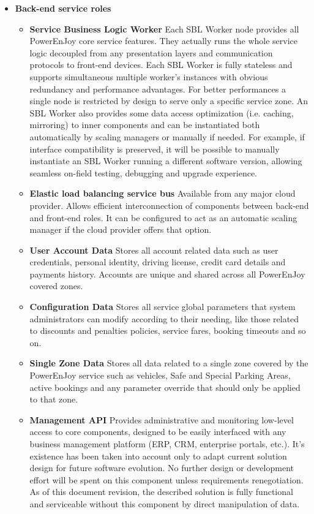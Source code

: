 \begin{itemize}
\item{\textbf{Back-end service roles}}
\begin{itemize}
\item{\textbf{Service Business Logic Worker}}\newline
Each SBL Worker node provides all PowerEnJoy core service features. They actually runs the whole service logic decoupled from any presentation layers and communication protocols to front-end devices. Each SBL Worker is fully stateless and supports simultaneous multiple worker's instances with obvious redundancy and performance advantages. For better performances a single node is restricted by design to serve only a specific service zone. An SBL Worker also provides some data access optimization (i.e. caching, mirroring) to inner components and can be instantiated both automatically by scaling managers or manually if needed. For example, if interface compatibility is preserved, it will be possible to manually instantiate an SBL Worker running a different software version, allowing seamless on-field testing, debugging and upgrade experience.
\item{\textbf{Elastic load balancing service bus}}\newline
Available from any major cloud provider. Allows efficient interconnection of components between back-end and front-end roles. It can be configured to act as an automatic scaling manager if the cloud provider offers that option.
\item{\textbf{User Account Data}}\newline
Stores all account related data such as user credentials, personal identity, driving license, credit card details and payments history. Accounts are unique and shared across all PowerEnJoy covered zones.
\item{\textbf{Configuration Data}}\newline
Stores all service global parameters that system administrators can modify according to their needing, like those related to discounts and penalties policies, service fares, booking timeouts and so on.
\item{\textbf{Single Zone Data}}\newline
Stores all data related to a single zone covered by the PowerEnJoy service such as vehicles, Safe and Special Parking Areas, active bookings and any parameter override that should only be applied to that zone.
\item{\textbf{Management API}}\newline
Provides administrative and monitoring low-level access to core components, designed to be easily interfaced with any business management platform (ERP, CRM, enterprise portals, etc.). It's existence has been taken into account only to adapt current solution design for future software evolution. No further design or development effort will be spent on this component unless requirements renegotiation. As of this document revision, the described solution is fully functional and serviceable without this component by direct manipulation of data.
\end{itemize}
\end{itemize}

